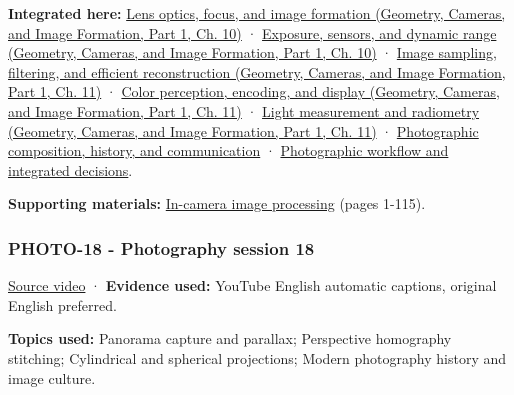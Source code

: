 \textbf{Integrated here:} \href{../03-Geometry-Cameras-and-Image-Formation-P01/main.pdf\#03-visual-computing-i-ch003-lens-optics-focus-and-image-formation}{Lens optics, focus, and image formation (Geometry, Cameras, and Image Formation, Part 1, Ch. 10)} · \href{../03-Geometry-Cameras-and-Image-Formation-P01/main.pdf\#03-visual-computing-i-ch003-exposure-sensors-and-dynamic-range}{Exposure, sensors, and dynamic range (Geometry, Cameras, and Image Formation, Part 1, Ch. 10)} · \href{../03-Geometry-Cameras-and-Image-Formation-P01/main.pdf\#03-visual-computing-i-ch004-image-sampling-filtering-and-efficient-reconstruction}{Image sampling, filtering, and efficient reconstruction (Geometry, Cameras, and Image Formation, Part 1, Ch. 11)} · \href{../03-Geometry-Cameras-and-Image-Formation-P01/main.pdf\#03-visual-computing-i-ch004-color-perception-encoding-and-display}{Color perception, encoding, and display (Geometry, Cameras, and Image Formation, Part 1, Ch. 11)} · \href{../03-Geometry-Cameras-and-Image-Formation-P01/main.pdf\#03-visual-computing-i-ch004-light-measurement-and-radiometry}{Light measurement and radiometry (Geometry, Cameras, and Image Formation, Part 1, Ch. 11)} · \hyperref[04-visual-computing-ii-ch034-photographic-composition-history-and-communication]{Photographic composition, history, and communication} · \hyperref[04-visual-computing-ii-ch034-photographic-workflow-and-integrated-decisions]{Photographic workflow and integrated decisions}.

\textbf{Supporting materials:} \href{https://drive.google.com/open?id=0B6w2XfPHEcZYeTFKZWhndVBOYTA}{In-camera image processing} (pages 1-115).

\subsubsection{PHOTO-18 - Photography session 18}\label{04-visual-computing-ii-ch036-photo-18---photography-session-18}

\hypertarget{04-visual-computing-ii-ch036-photo-18---photography-session-18}{}

\href{https://www.youtube.com/watch?v=fE0GQ9Tvn4U}{Source video} · \textbf{Evidence used:} YouTube English automatic captions, original English preferred.

\textbf{Topics used:} Panorama capture and parallax; Perspective homography stitching; Cylindrical and spherical projections; Modern photography history and image culture.

